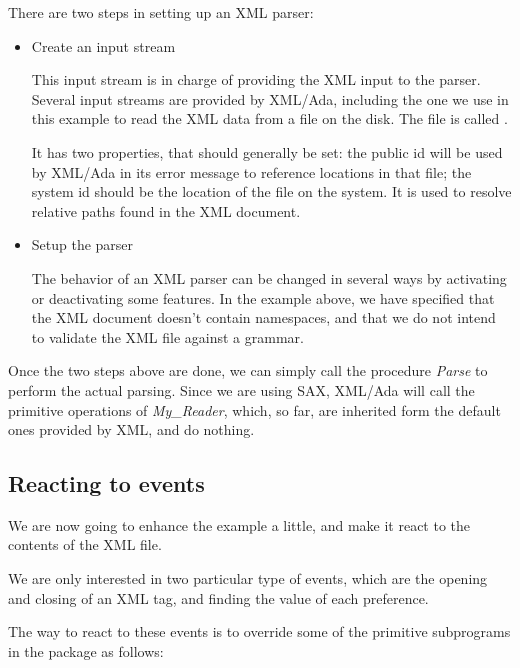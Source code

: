\documentclass[letterpaper,10pt,english]{sphinxmanual}
\begin{document}
There are two steps in setting up an XML parser:
\begin{itemize}
\item {} 
Create an input stream

This input stream is in charge of providing the XML input to the parser.
Several input streams are provided by XML/Ada, including the one we use in
this example to read the XML data from a file on the disk. The file is called
.

It has two properties, that should generally be set: the public id will be
used by XML/Ada in its error message to reference locations in that file; the
system id should be the location of the file on the system. It is used to
resolve relative paths found in the XML document.

\item {} 
Setup the parser

The behavior of an XML parser can be changed in several ways by activating or
deactivating some features. In the example above, we have specified that the
XML document doesn't contain namespaces, and that we do not intend to
validate the XML file against a grammar.

\end{itemize}

Once the two steps above are done, we can simply call the procedure \emph{Parse} to
perform the actual parsing. Since we are using SAX, XML/Ada will call the
primitive operations of \emph{My\_Reader}, which, so far, are inherited form the
default ones provided by XML, and do nothing.


\subsection{Reacting to events}
\label{sax:reacting-to-events}
We are now going to enhance the example a little, and make it react to the
contents of the XML file.

We are only interested in two particular type of events, which are the opening
and closing of an XML tag, and finding the value of each preference.

The way to react to these events is to override some of the primitive
subprograms in the package  as follows:
\end{document}
